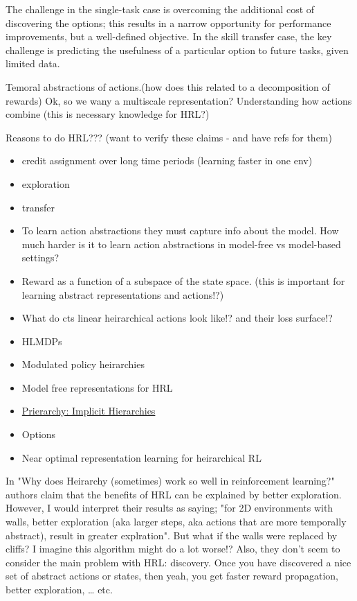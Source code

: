 \begin{displayquote}
  The challenge in the single-task case is overcoming the additional cost of discovering the options; this results in a narrow opportunity for performance improvements, but a well-defined objective. In the skill transfer case, the key challenge is predicting the usefulness of a particular option to future tasks, given limited data. \cite{Konidaris2019}
\end{displayquote}


Temoral abstractions of actions.(how does this related to a
decomposition of rewards) Ok, so we wany a multiscale representation?
Understanding how actions combine (this is necessary knowledge for HRL?)

Reasons to do HRL??? (want to verify these claims - and have refs for
them)

\begin{itemize}
\item
  credit assignment over long time periods (learning faster in one env)
\item
  exploration
\item
  transfer
\item
  To learn action abstractions they must capture info about the model.
  How much harder is it to learn action abstractions in model-free vs
  model-based settings?
\item
  Reward as a function of a subspace of the state space. (this is
  important for learning abstract representations and actions!?)
\item
  What do cts linear heirarchical actions look like!? and their loss
  surface!?
\item
  HLMDPs \cite{Saxea}
\item
  Modulated policy heirarchies \cite{Pashevich}
\item
  Model free representations for HRL \cite{Rafati}
\item
  \href{https://blog.aqnichol.com/2019/04/03/prierarchy-implicit-hierarchies/}{Prierarchy:
  Implicit Hierarchies}
\item
  Options
\item
  Near optimal representation learning for heirarchical RL \cite{Nachum2018}
\end{itemize}

In "Why does Heirarchy (sometimes) work so well in reinforcement learning?" \cite{Dadashi2018}
authors claim that the benefits of HRL can be explained by better
exploration. However, I would interpret their results as saying; "for
2D environments with walls, better exploration (aka larger steps, aka actions that are more temporally abstract), result in greater
explration". But what if the walls were replaced by cliffs? I imagine
this algorithm might do a lot worse!? Also, they don't seem to consider the main problem with HRL: discovery.
Once you have discovered a nice set of abstract actions or states, then yeah,
you get faster reward propagation, better exploration, \ldots{} etc.
